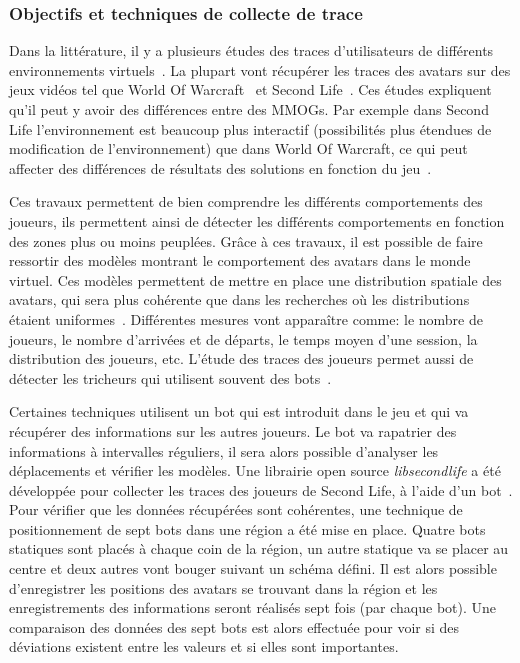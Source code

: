 		\subsubsection{Objectifs et techniques de collecte de trace}
		\par Dans la littérature, il y a plusieurs études des traces d'utilisateurs de différents environnements virtuels~\cite{1326262,0295-5075-88-4-48007}. La plupart vont récupérer les traces des avatars sur des jeux vidéos tel que World Of Warcraft~\cite{wow} et Second Life~\cite{sl}. Ces études expliquent qu'il peut y avoir des différences entre des MMOGs. Par exemple dans Second Life l'environnement est beaucoup plus interactif (possibilités plus étendues de modification de l'environnement) que dans World Of Warcraft, ce qui peut affecter des différences de résultats des solutions en fonction du jeu~\cite{DBLP:journals/corr/abs-0807-2328,1613041}. \\
\par Ces travaux permettent de bien comprendre les différents comportements des joueurs, ils permettent ainsi de détecter les différents comportements en fonction des zones plus ou moins peuplées. Grâce à ces travaux, il est possible de faire ressortir des modèles montrant le comportement des avatars dans le monde virtuel. Ces modèles permettent de mettre en place une distribution spatiale des avatars, qui sera plus cohérente que dans les recherches où les distributions étaient uniformes~\cite{Knutsson04peer-to-peersupport}. Différentes mesures vont apparaître comme: le nombre de joueurs, le nombre d'arrivées et de départs, le temps moyen d'une session, la distribution des joueurs, etc. L'étude des traces des joueurs permet aussi de détecter les tricheurs qui utilisent souvent des bots~\cite{0295-5075-88-4-48007}. \\
	\par Certaines techniques utilisent un bot qui est introduit dans le jeu et qui va récupérer des informations sur les autres joueurs. Le bot va rapatrier des informations à intervalles réguliers, il sera alors possible d'analyser les déplacements et vérifier les modèles. Une librairie open source \textit{libsecondlife} a été développée pour collecter les traces des joueurs de Second Life, à l'aide d'un bot~\cite{DBLP:journals/corr/abs-0807-2328}. Pour vérifier que les données récupérées sont cohérentes, une technique de positionnement de sept bots dans une région a été mise en place. Quatre bots statiques sont placés à chaque coin de la région, un autre statique va se placer au centre et deux autres vont bouger suivant un schéma défini. Il est alors possible d'enregistrer les positions des avatars se trouvant dans la région et les enregistrements des informations seront réalisés sept fois (par chaque bot). Une comparaison des données des sept bots est alors effectuée pour voir si des déviations existent entre les valeurs et si elles sont importantes.\\  
